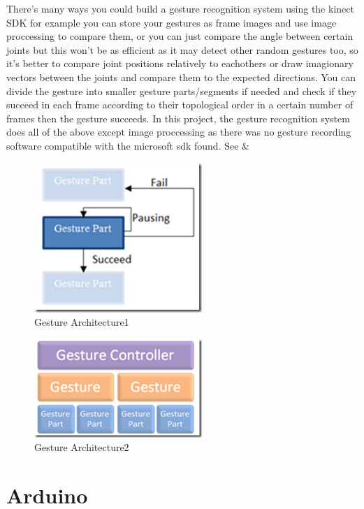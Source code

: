 There's many ways you could build a gesture recognition system using the kinect SDK for example you can store your gestures as frame images and use image proccessing to compare them, or you can just compare the angle between certain joints but this won't be as efficient as it may detect other random gestures too, so it's better to compare joint positions relatively to eachothers or draw imagionary vectors between the joints and compare them to the expected directions. 
You can divide the gesture into smaller gesture parts/segments if needed and check if they succeed in each frame according to their topological order in a certain number of frames then the gesture succeeds.
In this project, the gesture recognition system does all of the above except image proccessing as there was no gesture recording software compatible with the microsoft sdk found.
See  & 
\begin{figure}[bp]
  \centering
  \includegraphics[width=0.5\linewidth]{GestureArchitecture1}
  \caption{Gesture Architecture1 }
  \label{fig:gesturearchitecture1}
\end{figure}

\begin{figure}[tp]
  \centering
  \includegraphics[width=0.5\linewidth]{GestureArchitecture2}
  \caption{Gesture Architecture2}
  \label{fig:gesturearchitecture2}
\end{figure}


\section{Arduino}

